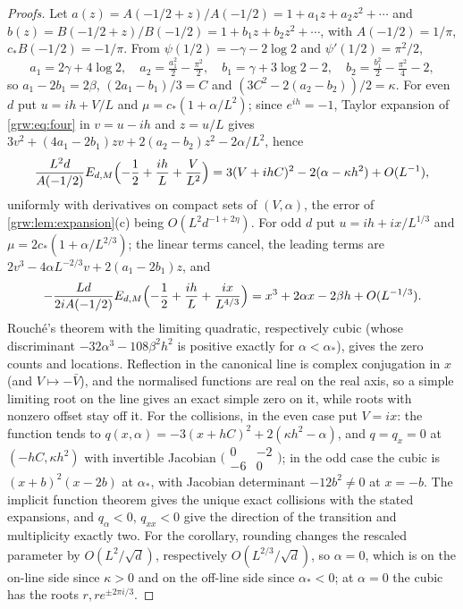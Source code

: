 
\begin{proof}[Proofs]
Let $a(z)=A(-1/2+z)/A(-1/2)=1+a_1z+a_2z^2+\cdots$ and
$b(z)=B(-1/2+z)/B(-1/2)=1+b_1z+b_2z^2+\cdots$, with $A(-1/2)=1/\pi$,
$c_*B(-1/2)=-1/\pi$. From $\psi(1/2)=-\gamma-2\log2$ and
$\psi'(1/2)=\pi^2/2$,
\[
 a_1=2\gamma+4\log2,\quad a_2=\tfrac{a_1^2}2-\tfrac{\pi^2}2,\quad
 b_1=\gamma+3\log2-2,\quad b_2=\tfrac{b_1^2}2-\tfrac{\pi^2}4-2,
\]
so $a_1-2b_1=2\beta$, $(2a_1-b_1)/3=C$ and $(3C^2-2(a_2-b_2))/2=\kappa$. For
even $d$ put $u=ih+V/L$ and $\mu=c_*(1+\alpha/L^2)$; since $e^{ih}=-1$,
Taylor expansion of \eqref{grw:eq:four} in $v=u-ih$ and $z=u/L$ gives
$3v^2+(4a_1-2b_1)zv+2(a_2-b_2)z^2-2\alpha/L^2$, hence
\[
 \frac{L^2d}{A(-1/2)}E_{d,M}\Bigl(-\frac12+\frac{ih}L+\frac V{L^2}\Bigr)
 =3(V+ihC)^2-2(\alpha-\kappa h^2)+O(L^{-1}),
\]
uniformly with derivatives on compact sets of $(V,\alpha)$, the error of
\cref{grw:lem:expansion}(c) being $O(L^2d^{-1+2\eta})$. For odd $d$ put
$u=ih+ix/L^{1/3}$ and $\mu=2c_*(1+\alpha/L^{2/3})$; the linear terms cancel,
the leading terms are $2v^3-4\alpha L^{-2/3}v+2(a_1-2b_1)z$, and
\[
 -\frac{Ld}{2iA(-1/2)}E_{d,M}\Bigl(-\frac12+\frac{ih}L+\frac{ix}{L^{4/3}}\Bigr)
 =x^3+2\alpha x-2\beta h+O(L^{-1/3}).
\]
Rouch\'e's theorem with the limiting quadratic, respectively cubic (whose
discriminant $-32\alpha^3-108\beta^2h^2$ is positive exactly for
$\alpha<\alpha_*$), gives the zero counts and locations. Reflection in the
canonical line is complex conjugation in $x$ (and $V\mapsto-\bar V$), and the
normalised functions are real on the real axis, so a simple limiting root on
the line gives an exact simple zero on it, while roots with nonzero offset
stay off it. For the collisions, in the even case put $V=ix$: the function
tends to $q(x,\alpha)=-3(x+hC)^2+2(\kappa h^2-\alpha)$, and $q=q_x=0$ at
$(-hC,\kappa h^2)$ with invertible Jacobian
$\bigl(\begin{smallmatrix}0&-2\\-6&0\end{smallmatrix}\bigr)$; in the odd case
the cubic is $(x+b)^2(x-2b)$ at $\alpha_*$, with Jacobian determinant
$-12b^2\ne0$ at $x=-b$. The implicit function theorem gives the unique exact
collisions with the stated expansions, and $q_\alpha<0$, $q_{xx}<0$ give the
direction of the transition and multiplicity exactly two. For the corollary,
rounding changes the rescaled parameter by $O(L^2/\sqrt d)$, respectively
$O(L^{2/3}/\sqrt d)$, so $\alpha=0$, which is on the on-line side since
$\kappa>0$ and on the off-line side since $\alpha_*<0$; at $\alpha=0$ the
cubic has the roots $r,re^{\pm2\pi i/3}$.
\end{proof}

